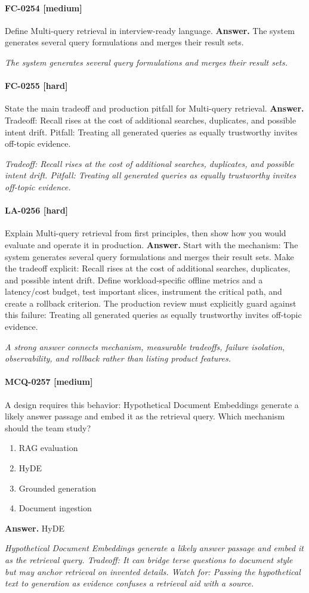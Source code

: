 \paragraph{FC-0254 [medium]} Define Multi-query retrieval in interview-ready language.
\noindent\textbf{Answer.} The system generates several query formulations and merges their result sets.
\par\textit{The system generates several query formulations and merges their result sets.}
\paragraph{FC-0255 [hard]} State the main tradeoff and production pitfall for Multi-query retrieval.
\noindent\textbf{Answer.} Tradeoff: Recall rises at the cost of additional searches, duplicates, and possible intent drift. Pitfall: Treating all generated queries as equally trustworthy invites off-topic evidence.
\par\textit{Tradeoff: Recall rises at the cost of additional searches, duplicates, and possible intent drift. Pitfall: Treating all generated queries as equally trustworthy invites off-topic evidence.}
\paragraph{LA-0256 [hard]} Explain Multi-query retrieval from first principles, then show how you would evaluate and operate it in production.
\noindent\textbf{Answer.} Start with the mechanism: The system generates several query formulations and merges their result sets. Make the tradeoff explicit: Recall rises at the cost of additional searches, duplicates, and possible intent drift. Define workload-specific offline metrics and a latency/cost budget, test important slices, instrument the critical path, and create a rollback criterion. The production review must explicitly guard against this failure: Treating all generated queries as equally trustworthy invites off-topic evidence.
\par\textit{A strong answer connects mechanism, measurable tradeoffs, failure isolation, observability, and rollback rather than listing product features.}
\paragraph{MCQ-0257 [medium]} A design requires this behavior: Hypothetical Document Embeddings generate a likely answer passage and embed it as the retrieval query. Which mechanism should the team study?
\begin{enumerate}[label=\Alph*.]
\item RAG evaluation
\item HyDE
\item Grounded generation
\item Document ingestion
\end{enumerate}
\noindent\textbf{Answer.} HyDE
\par\textit{Hypothetical Document Embeddings generate a likely answer passage and embed it as the retrieval query. Tradeoff: It can bridge terse questions to document style but may anchor retrieval on invented details. Watch for: Passing the hypothetical text to generation as evidence confuses a retrieval aid with a source.}
